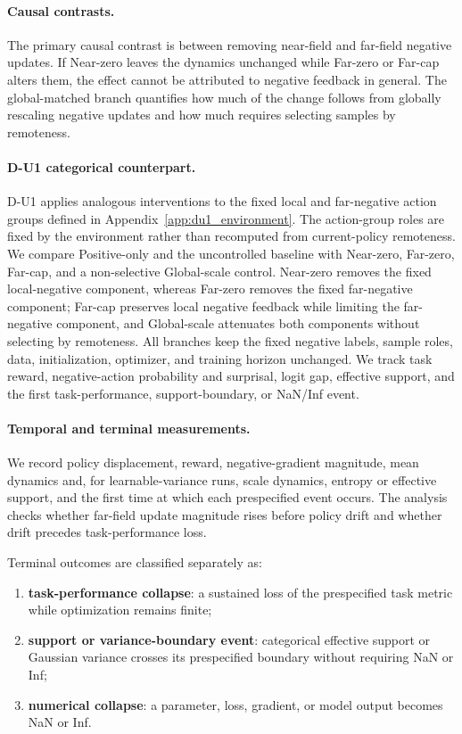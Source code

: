 \documentclass{article}
\theoremstyle{plain}
\theoremstyle{definition}
\theoremstyle{remark}
\begin{document}
\paragraph{Causal contrasts.}
The primary causal contrast is between removing near-field and
far-field negative updates. If Near-zero leaves the dynamics unchanged
while Far-zero or Far-cap alters them, the effect cannot be attributed
to negative feedback in general. The global-matched branch quantifies
how much of the change follows from globally rescaling negative updates
and how much requires selecting samples by remoteness.

\paragraph{D-U1 categorical counterpart.}
D-U1 applies analogous interventions to the fixed local and far-negative
action groups defined in Appendix~\ref{app:du1_environment}. The action-group
roles are fixed by the environment rather than recomputed from current-policy
remoteness. We compare Positive-only and the uncontrolled baseline with
Near-zero, Far-zero, Far-cap, and a non-selective Global-scale control.
Near-zero removes the fixed local-negative component, whereas Far-zero removes
the fixed far-negative component; Far-cap preserves local negative feedback
while limiting the far-negative component, and Global-scale attenuates both
components without selecting by remoteness. All branches keep the fixed
negative labels, sample roles, data, initialization, optimizer, and training
horizon unchanged. We track task reward, negative-action probability and
surprisal, logit gap, effective support, and the first task-performance,
support-boundary, or NaN/Inf event.

\paragraph{Temporal and terminal measurements.}
We record policy displacement, reward, negative-gradient magnitude,
mean dynamics and, for learnable-variance runs, scale dynamics, entropy or effective support, and the first
time at which each prespecified event occurs. The analysis checks whether
far-field update magnitude rises before policy drift and whether drift precedes
task-performance loss.

Terminal outcomes are classified separately as:

\begin{enumerate}
    \item \textbf{task-performance collapse}: a sustained loss of the
    prespecified task metric while optimization remains finite;
    \item \textbf{support or variance-boundary event}: categorical
    effective support or Gaussian variance crosses its prespecified
    boundary without requiring NaN or Inf;
    \item \textbf{numerical collapse}: a parameter, loss, gradient, or
    model output becomes NaN or Inf.
\end{enumerate}
\end{document}
